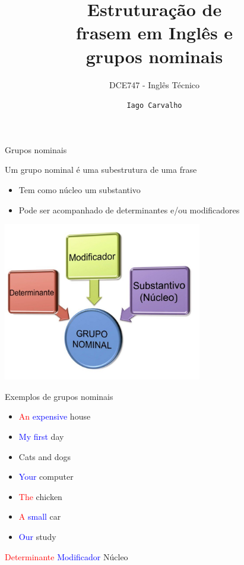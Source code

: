 \documentclass[compress,mathserif,xcolor=table]{beamer}
\title{Estruturação de \\ frasem em Inglês e \\ grupos nominais}
\subtitle{DCE747 - Inglês Técnico}
\author{\texttt{Iago Carvalho}}
\institute{\texttt{Departamento de Ciência da Computação}}
\begin{document}
\begin{frame}
\titlepage

\end{frame}


\begin{frame}{Grupos nominais}

Um grupo nominal é uma subestrutura de uma frase
\begin{itemize}
    \item Tem como núcleo um substantivo
    \item Pode ser acompanhado de determinantes e/ou modificadores
\end{itemize}

\vspace{0.5cm}

\centering \includegraphics[width=0.65\textwidth]{images/grupo_nominal.jpg}
\end{frame}


\begin{frame}{Exemplos de grupos nominais}

\begin{itemize}
    \item \textcolor{red}{An} \textcolor{blue}{expensive} \textcolor{bronze}{house}
    \item \textcolor{blue}{My} \textcolor{blue}{first} \textcolor{bronze}{day}
    \item \textcolor{bronze}{Cats} and \textcolor{bronze}{dogs}
    \item \textcolor{blue}{Your} \textcolor{bronze}{computer}
    \item \textcolor{red}{The} \textcolor{bronze}{chicken}
    \item \textcolor{red}{A} \textcolor{blue}{small} \textcolor{bronze}{car}
    \item \textcolor{blue}{Our} \textcolor{bronze}{study}
\end{itemize}

\vspace{1.5cm}

\hline

\textcolor{red}{Determinante} \hspace{2.5cm} \textcolor{blue}{Modificador} \hspace{2.5cm} \textcolor{bronze}{Núcleo}

\end{frame}
\end{document}
